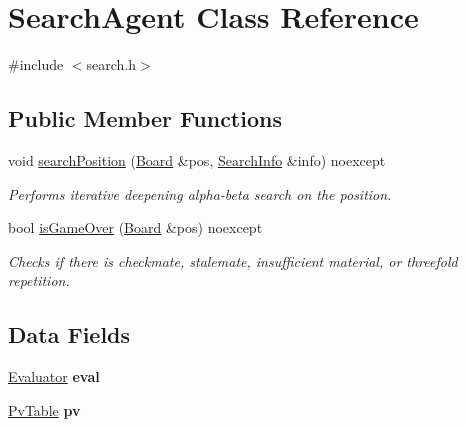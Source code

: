 \hypertarget{classSearchAgent}{}\section{Search\+Agent Class Reference}
\label{classSearchAgent}


{\ttfamily \#include $<$search.\+h$>$}

\subsection*{Public Member Functions}
\begin{DoxyCompactItemize}
\item 
void \mbox{\hyperlink{classSearchAgent_a9bf258c0e75f45ab803cdcbde4d90fee}{search\+Position}} (\mbox{\hyperlink{classBoard}{Board}} \&pos, \mbox{\hyperlink{structSearchInfo}{Search\+Info}} \&info) noexcept
\begin{DoxyCompactList}\small\item\em Performs iterative deepening alpha-\/beta search on the position. \end{DoxyCompactList}\item 
bool \mbox{\hyperlink{classSearchAgent_ae345af56fed112c0c826653c07e2cd99}{is\+Game\+Over}} (\mbox{\hyperlink{classBoard}{Board}} \&pos) noexcept
\begin{DoxyCompactList}\small\item\em Checks if there is checkmate, stalemate, insufficient material, or threefold repetition. ~\newline
 \end{DoxyCompactList}\end{DoxyCompactItemize}
\subsection*{Data Fields}
\begin{DoxyCompactItemize}
\item 
\mbox{\label{classSearchAgent_aaccc22d27a8b90a72608d3ff0bf4f758}} 
\mbox{\hyperlink{classEvaluator}{Evaluator}} {\bfseries eval}
\item 
\mbox{\label{classSearchAgent_ac010d05e44c840531d4e9b05ec58b46a}} 
\mbox{\hyperlink{classPvTable}{Pv\+Table}} {\bfseries pv}
\end{DoxyCompactItemize}
